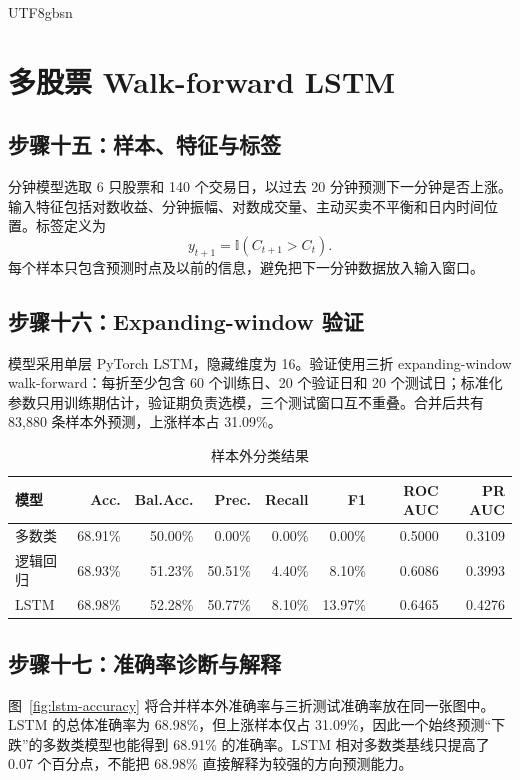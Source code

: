 \documentclass[a4paper,11pt,openany]{report}
\begin{document}
\begin{CJK*}{UTF8}{gbsn}
\chapter{多股票 Walk-forward LSTM}

\section{步骤十五：样本、特征与标签}

分钟模型选取 6 只股票和 140 个交易日，以过去 20 分钟预测下一分钟是否上涨。输入特征包括对数收益、分钟振幅、对数成交量、主动买卖不平衡和日内时间位置。标签定义为
\begin{equation}
y_{t+1}=\mathbb{I}(C_{t+1}>C_t).
\end{equation}
每个样本只包含预测时点及以前的信息，避免把下一分钟数据放入输入窗口。

\section{步骤十六：Expanding-window 验证}

模型采用单层 PyTorch LSTM，隐藏维度为 16。验证使用三折 expanding-window walk-forward：每折至少包含 60 个训练日、20 个验证日和 20 个测试日；标准化参数只用训练期估计，验证期负责选模，三个测试窗口互不重叠。合并后共有 83,880 条样本外预测，上涨样本占 31.09\%。

\begin{table}[H]
\centering
\small
\caption{样本外分类结果}
\begin{tabular}{lrrrrrrr}
\toprule
模型 & Acc. & Bal.Acc. & Prec. & Recall & F1 & ROC AUC & PR AUC \\
\midrule
多数类 & 68.91\% & 50.00\% & 0.00\% & 0.00\% & 0.00\% & 0.5000 & 0.3109 \\
逻辑回归 & 68.93\% & 51.23\% & 50.51\% & 4.40\% & 8.10\% & 0.6086 & 0.3993 \\
LSTM & 68.98\% & 52.28\% & 50.77\% & 8.10\% & 13.97\% & 0.6465 & 0.4276 \\
\bottomrule
\end{tabular}
\end{table}

\section{步骤十七：准确率诊断与解释}

图~\ref{fig:lstm-accuracy} 将合并样本外准确率与三折测试准确率放在同一张图中。LSTM 的总体准确率为 68.98\%，但上涨样本仅占 31.09\%，因此一个始终预测“下跌”的多数类模型也能得到 68.91\% 的准确率。LSTM 相对多数类基线只提高了 0.07 个百分点，不能把 68.98\% 直接解释为较强的方向预测能力。


\end{CJK*}
\end{document}
